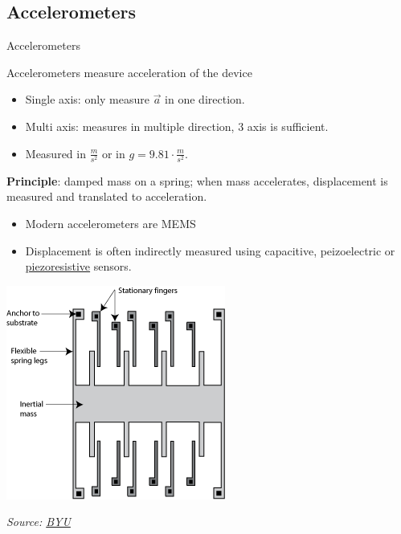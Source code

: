 \documentclass[compress]{beamer}
\newcommand{\source}[2]{{\tiny\it Source: \href{#1}{#2}}}
\begin{document}
\subsection{Accelerometers}
\begin{frame}{Accelerometers}

    Accelerometers measure acceleration of the device

    \begin{itemize}

        \item Single axis: only measure $\vec{a}$ in one direction.
        \item Multi axis: measures in multiple direction, 3 axis is sufficient.
        \item Measured in $\frac{m}{s^2}$ or in $g = 9.81\cdot\frac{m}{s^2}$.
    \end{itemize}

    {\bf Principle}: damped mass on a spring; when mass accelerates,
    displacement is measured and translated to acceleration.

    \begin{multicols}{2}
        \begin{itemize}

            \item Modern accelerometers are MEMS

            \item Displacement is often indirectly measured using capacitive, peizoelectric
                  or \href{http://en.wikipedia.org/wiki/Piezoresistive_effect}{piezoresistive}
                  sensors.

                  \vfill
                  \columnbreak

        \end{itemize}

        \begin{center}
            \includegraphics[width=0.6\linewidth]{accelero}

            \source{http://research.et.byu.edu/llhwww/intro/memsintro.html}{BYU}
        \end{center}
    \end{multicols}



\end{frame}
\end{document}
